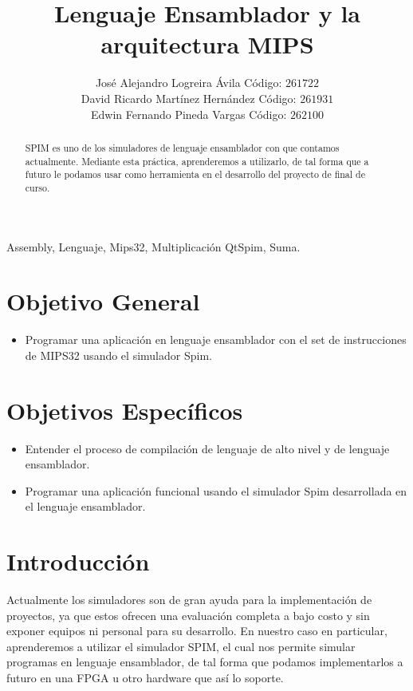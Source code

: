 \documentclass[twocolumn]{IEEEtran}
\begin{document}
\title{Lenguaje Ensamblador y la arquitectura MIPS}
\author{José Alejandro Logreira Ávila Código: $261722$\\
	David Ricardo Martínez Hernández Código: $261931$\\
	Edwin Fernando Pineda Vargas Código: $262100$}
\maketitle
{}
\begin{keywords}
Assembly, Lenguaje, Mips32, Multiplicación QtSpim, Suma.
\end{keywords}
\begin{abstract}
SPIM es uno de los simuladores de lenguaje ensamblador con que contamos actualmente. Mediante esta práctica, aprenderemos a utilizarlo, de tal forma que a futuro le podamos usar como herramienta en el desarrollo del proyecto de final de curso.
\end{abstract}

\section{Objetivo General}
\begin{itemize}
 \item Programar una aplicación en lenguaje ensamblador con el set de instrucciones de MIPS32 usando el simulador Spim.
\end{itemize}

\section{Objetivos Específicos}
\begin{itemize}
 \item Entender el proceso de compilación de lenguaje de alto nivel y de lenguaje ensamblador.
 \item Programar una aplicación funcional usando el simulador Spim desarrollada en el lenguaje ensamblador.
\end{itemize}

\section{Introducción}
\noindent
Actualmente los simuladores son de gran ayuda para la implementación de proyectos, ya que estos ofrecen una evaluación completa a bajo costo y sin exponer equipos ni personal para su desarrollo. En nuestro caso en particular, aprenderemos a utilizar el simulador SPIM, el cual nos permite simular programas en lenguaje ensamblador, de tal forma que podamos implementarlos a futuro en una FPGA u otro hardware que así lo soporte.
\end{document}
